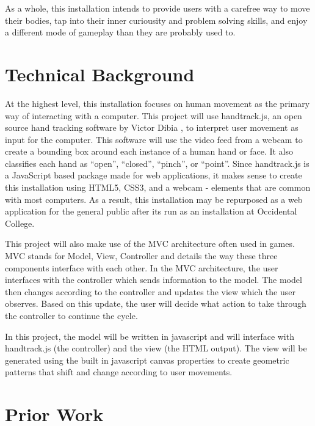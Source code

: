 \documentclass[10pt,twocolumn]{article}
\begin{document}
As a whole, this installation intends to provide users with a carefree way to move their bodies, tap into their inner curiousity and problem solving skills, and enjoy a different mode of gameplay than they are probably used to. 

\section{Technical Background}
At the highest level, this installation focuses on human movement as the primary way of interacting with a computer.  This project will use handtrack.js, an open source hand tracking software by Victor Dibia \cite{}, to interpret user movement as input for the computer.  This software will use the video feed from a webcam to create a bounding box around each instance of a human hand or face.  It also classifies each hand as ``open'', ``closed'', ``pinch'', or ``point''.  Since handtrack.js is a JavaScript based package made for web applications, it makes sense to create this installation using HTML5, CSS3, and a webcam - elements that are common with most computers.   As a result, this installation may be repurposed as a web application for the general public after its run as an installation at Occidental College. 

This project will also make use of the MVC architecture often used in games.  MVC stands for Model, View, Controller and details the way these three components interface with each other. In the MVC architecture, the user interfaces with the controller which sends information to the model.  The model then changes according to the controller and updates the view which the user observes.  Based on this update, the user will decide what action to take through the controller to continue the cycle. 

In this project, the model will be written in javascript and will interface with handtrack.js (the controller) and the view (the HTML output).  The view will be generated using the built in javascript canvas properties to create geometric patterns that shift and change according to user movements. 
\section{Prior Work}
\end{document}
